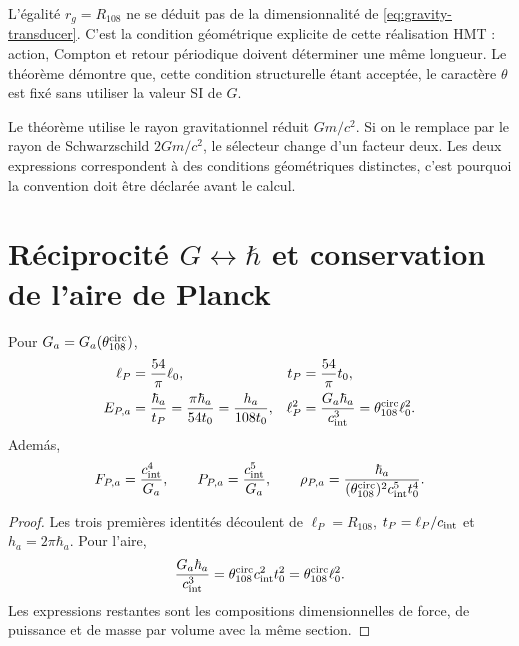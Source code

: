 L'égalité \(r_g=R_{108}\) ne se déduit pas de la dimensionnalité de
\cref{eq:gravity-transducer}. C'est la condition géométrique explicite de cette
réalisation HMT : action, Compton et retour périodique doivent déterminer une même
longueur. Le théorème démontre que, cette condition structurelle étant acceptée, le
caractère \(\theta\) est fixé sans utiliser la valeur SI de \(G\).

\begin{remark}
Le théorème utilise le rayon gravitationnel réduit \(Gm/c^2\). Si on le remplace
par le rayon de Schwarzschild \(2Gm/c^2\), le sélecteur change d'un facteur
deux. Les deux expressions correspondent à des conditions géométriques distinctes,
c'est pourquoi la convention doit être déclarée avant le calcul.
\end{remark}

\section{Réciprocité \(G\leftrightarrow\hbar\) et conservation de l'aire de Planck}

\begin{corollary}
\label{cor:gravity-planck-family}
Pour \(G_a=G_a(\theta_{108}^{\rm circ})\),
\begin{align}
\ell_P&=\frac{54}{\pi}\ell_0,
&t_P&=\frac{54}{\pi}t_0,
\label{eq:gravity-planck-length-time}\\
E_{P,a}&=\frac{\hbar_a}{t_P}
=\frac{\pi\hbar_a}{54t_0}
=\frac{h_a}{108t_0},
&\ell_P^2&=\frac{G_a\hbar_a}{c_{\rm int}^3}
=\theta_{108}^{\rm circ}\ell_0^2.
\label{eq:gravity-planck-energy-area}
\end{align}
Adem\'as,
\begin{equation}
\label{eq:gravity-planck-force-power-density}
F_{P,a}=\frac{c_{\rm int}^4}{G_a},
\qquad
P_{P,a}=\frac{c_{\rm int}^5}{G_a},
\qquad
\rho_{P,a}=\frac{\hbar_a}
{(\theta_{108}^{\rm circ})^2c_{\rm int}^5t_0^4}.
\end{equation}
\end{corollary}

\begin{proof}
Les trois premières identités découlent de
\(\ell_P=R_{108}\), \(t_P=\ell_P/c_{\rm int}\) et
\(h_a=2\pi\hbar_a\). Pour l'aire,
\[
\frac{G_a\hbar_a}{c_{\rm int}^3}
=\theta_{108}^{\rm circ}c_{\rm int}^2t_0^2
=\theta_{108}^{\rm circ}\ell_0^2.
\]
Les expressions restantes sont les compositions dimensionnelles de force,
de puissance et de masse par volume avec la même section.
\end{proof}


